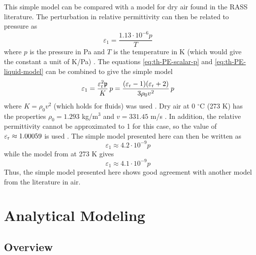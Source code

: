 \documentclass[11pt,twoside]{eitExjobb}
\begin{document}
	This simple model can be compared with a model for dry air found in the RASS literature. The perturbation in relative permittivity can then be related to pressure as \cite{Rapoport1997}
	\begin{equation*}
		\varepsilon_1 = \frac{1.13 \cdot 10^{-6} p}{T}
	\end{equation*}
	where $p$ is the pressure in Pa and $T$ is the temperature in K (which would give the constant a unit of K/Pa) . The equations \eqref{eq:th-PE-scalar-p} and \eqref{eq:th-PE-liquid-model} can be combined to give the simple model
	\begin{equation*}
		\varepsilon_1 = \frac{\varepsilon_{\mathrm{r}}^2 \mathfrak{p}}{K} \,p = \frac{(\varepsilon_{\mathrm{r}} - 1)(\varepsilon_{\mathrm{r}} + 2)}{3\rho_0 v^2} \,p
	\end{equation*}
	where $K = \rho_0 v^2$ (which holds for fluids) was used \cite{Schmerr2016}. Dry air at 0 $^\circ$C (273 K) has the properties $\rho_0 = 1.293$ kg/m$^3$ and $v = 331.45$ m/s \cite{Onda2003}. In addition, the relative permittivity cannot be approximated to 1 for this case, so the value of $\varepsilon_{\mathrm{r}} \approx 1.00059$ is used \cite{Hector1936}. The simple model presented here can then be written as
	\begin{equation*}
		\varepsilon_1 \approx 4.2 \cdot 10^{-9} p
	\end{equation*}
	while the model from \cite{Rapoport1997} at 273 K gives
	\begin{equation*}
		\varepsilon_1 \approx 4.1 \cdot 10^{-9} p
	\end{equation*}
	Thus, the simple model presented here shows good agreement with another model from the literature in air.
	
	
	\chapter{Analytical Modeling \label{ch:analytical}}
	
	\section{Overview}
	
\end{document}
